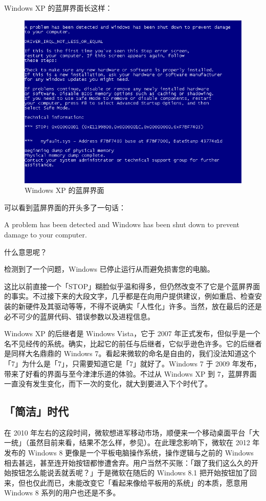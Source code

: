Windows XP 的蓝屏界面长这样：

\begin{figure}[htb!]
  \centering
  \includegraphics[width=.62\textwidth]{assets/advanced/Win-XP-BSoD.png}
  \caption{Windows XP 的蓝屏界面}
  \label{fig:Win-XP-BSoD}
\end{figure}

可以看到蓝屏界面的开头多了一句话：

\begin{quoting}
  A problem has been detected and Windows has been shut down to prevent damage to your computer.
\end{quoting}

什么意思呢？

\begin{quoting}
  检测到了一个问题，Windows 已停止运行从而避免损害您的电脑。
\end{quoting}

这比以前直接一个「STOP」糊脸似乎温和得多，但仍然改变不了它是个蓝屏界面的事实。不过接下来的大段文字，几乎都是在向用户提供建议，例如重启、检查安装的新硬件及其驱动等等，不得不说确实「人性化」许多。当然，放在最后的还是必不可少的蓝屏代码、错误参数以及进程信息。

Windows XP 的后继者是 Windows Vista，它于 2007 年正式发布，但似乎是一个名不见经传的系统。确实，比起它的前任与后继者，它似乎逊色许多。它的后继者是同样大名鼎鼎的 Windows 7。看起来微软的命名是自由的，我们没法知道这个「7」为什么是「7」，只需要知道它是「7」就好了。Windows 7 于 2009 年发布，带来了好看的界面与至今津津乐道的体验。不过从 Windows XP 到 7，蓝屏界面一直没有发生变化，而下一次的变化，就大到要进入下个时代了。

\subsection{「简洁」时代}

在 2010 年左右的这段时间，微软想进军移动市场，顺便来一个移动桌面平台「大一统」（虽然目前来看，结果不怎么样，参见）。在此理念影响下，微软在 2012 年发布的 Windows 8 更像是一个平板电脑操作系统，操作逻辑与之前的 Windows 相去甚远，甚至连开始按钮都惨遭舍弃。用户当然不买账：「跟了我们这么久的开始按钮怎么能说丢就丢呢？」于是微软在随后的 Windows 8.1 把开始按钮加了回来，但也仅此而已，未能改变它「看起来像给平板用的系统」的本质，愿意用 Windows 8 系列的用户也还是不多。

